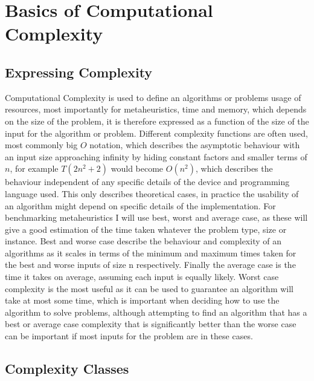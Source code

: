 \documentclass[]{final_report}
\begin{document}
\section*{Basics of Computational Complexity}

\subsection*{Expressing Complexity}

Computational Complexity is used to define an algorithms or problems usage of resources, most importantly for metaheuristics, time and memory, which depends on the size of the problem, it is therefore expressed as a function of the size of the input for the algorithm or problem. Different complexity functions are often used, most commonly big $O$ notation, which describes the asymptotic behaviour with an input size approaching infinity by hiding constant factors and smaller terms of $n$, for example $T(2n^{2} + 2)$ would become $O(n^{2})$, which describes the behaviour independent of any specific details of the device and programming language used\cite{barak:2007}. This only describes theoretical cases, in practice the usability of an algorithm might depend on specific details of the implementation. For benchmarking metaheuristics I will use best, worst and average case, as these will give a good estimation of the time taken whatever the problem type, size or instance. Best and worse case describe the behaviour and complexity of an algorithms as it scales in terms of the minimum and maximum times taken for the best and worse inputs of size n respectively. Finally the average case is the time it takes on average, assuming each input is equally likely. Worst case complexity is the most useful as it can be used to guarantee an algorithm will take at most some time, which is important when deciding how to use the algorithm to solve problems, although attempting to find an algorithm that has a best or average case complexity that is significantly better than the worse case can be important if most inputs for the problem are in these cases.

\subsection*{Complexity Classes}
\end{document}
